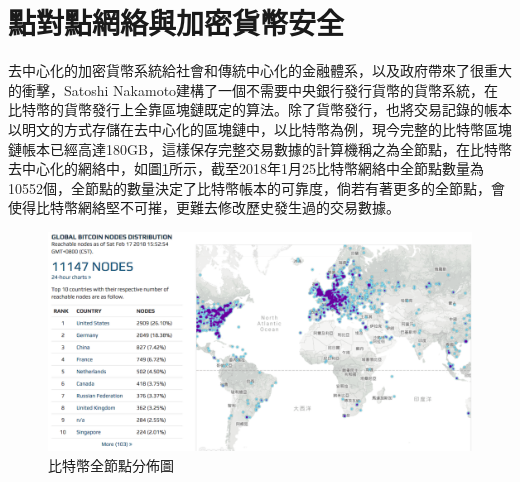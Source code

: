 
		\section{點對點網絡與加密貨幣安全}

		去中⼼化的加密貨幣系統給社會和傳統中⼼化的⾦融體系，以及政府帶來了很重⼤的衝擊，Satoshi Nakamoto建構了一個不需要中央銀行發行貨幣的貨幣系統，在比特幣的貨幣發行上全靠區塊鏈既定的算法。除了貨幣發行，也將交易記錄的帳本以明文的方式存儲在去中心化的區塊鏈中，以比特幣為例，現今完整的比特幣區塊鏈帳本已經高達180GB，這樣保存完整交易數據的計算機稱之為全節點，在比特幣去中心化的網絡中，如圖\ref{bitcoinfullnode}所示，截至2018年1月25比特幣網絡中全節點數量為10552個\supercite{bitcoinfullnode}，全節點的數量決定了比特幣帳本的可靠度，倘若有著更多的全節點，會使得比特幣網絡堅不可摧，更難去修改歷史發生過的交易數據。

		\begin{figure}
			\centering
			\includegraphics[width = .9\textwidth]{bitcoinfullnode.png}
			\caption{比特幣全節點分佈圖\supercite{bitcoinfullnode}}\label{bitcoinfullnode}
		\end{figure}

